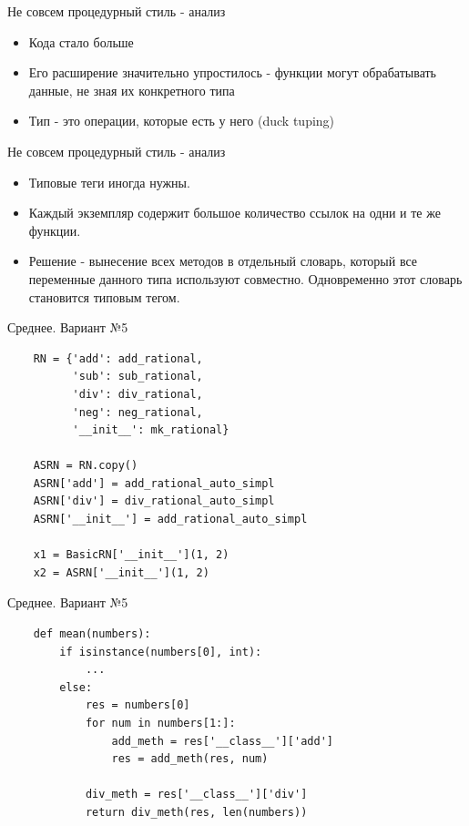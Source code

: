 \documentclass{article}
\begin{document}
\begin{center} Не совсем процедурный стиль - анализ \end{center}
\begin{itemize}
    \item Кода стало больше
    \item Его расширение значительно упростилось - функции 
            могут обрабатывать данные, не зная их конкретного типа
    \item Тип - это операции, которые есть у него (duck tuping)
\end{itemize}
\newpage

\begin{center} Не совсем процедурный стиль - анализ \end{center}
\begin{itemize}
    \item Типовые теги иногда нужны.
    \item Каждый экземпляр содержит большое количество ссылок на одни и те же
          функции.
    \item Решение - вынесение всех методов в отдельный словарь, который все 
          переменные данного типа используют совместно. Одновременно этот
          словарь становится типовым тегом.
\end{itemize}
\newpage

\begin{center} Среднее. Вариант №5 \end{center}
\begin{lstlisting}
    RN = {'add': add_rational, 
          'sub': sub_rational,
          'div': div_rational,               
          'neg': neg_rational,               
          '__init__': mk_rational}

    ASRN = RN.copy()
    ASRN['add'] = add_rational_auto_simpl 
    ASRN['div'] = div_rational_auto_simpl 
    ASRN['__init__'] = add_rational_auto_simpl 

    x1 = BasicRN['__init__'](1, 2)
    x2 = ASRN['__init__'](1, 2)
\end{lstlisting}
\newpage

\begin{center}  Среднее. Вариант №5 \end{center}
\begin{lstlisting}
    def mean(numbers):
        if isinstance(numbers[0], int):
            ...
        else:
            res = numbers[0]
            for num in numbers[1:]:
                add_meth = res['__class__']['add']
                res = add_meth(res, num)

            div_meth = res['__class__']['div']
            return div_meth(res, len(numbers))
\end{lstlisting}
\newpage
\end{document}
